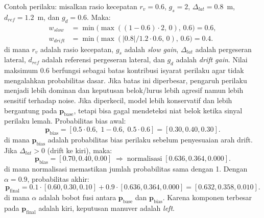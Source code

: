 \documentclass[conference]{IEEEtran}
\begin{document}
Contoh perilaku: misalkan rasio kecepatan $r_v=0.6$, $g_s=2$, $\Delta_{lat}=0.8$~m, $d_{ref}=1.2$~m, dan $g_d=0.6$. Maka:
\begin{align}
w_{slow} &= \min\big(\max((1-0.6)\cdot 2,\,0),\,0.6\big)=0.6, \\
w_{drift} &= \min\big(\max(|0.8|/1.2\cdot 0.6,\,0),\,0.6\big)=0.4.
\end{align}
di mana $r_v$ adalah rasio kecepatan, $g_s$ adalah \textit{slow gain}, $\Delta_{lat}$ adalah pergeseran lateral, $d_{ref}$ adalah referensi pergeseran lateral, dan $g_d$ adalah \textit{drift gain}.
Nilai maksimum 0.6 berfungsi sebagai batas kontribusi isyarat perilaku agar tidak mengalahkan probabilitas dasar. Jika batas ini diperbesar, pengaruh perilaku menjadi lebih dominan dan keputusan belok/lurus lebih agresif namun lebih sensitif terhadap noise. Jika diperkecil, model lebih konservatif dan lebih bergantung pada $\mathbf{p}_{\text{base}}$, tetapi bisa gagal mendeteksi niat belok ketika sinyal perilaku lemah.
Probabilitas bias awal:
\begin{equation}
\mathbf{p}_{\text{bias}}=[0.5\cdot 0.6,\;1-0.6,\;0.5\cdot 0.6]=[0.30,0.40,0.30].
\end{equation}
di mana $\mathbf{p}_{\text{bias}}$ adalah probabilitas bias perilaku sebelum penyesuaian arah drift.
Jika $\Delta_{lat}>0$ (drift ke kiri), maka:
\begin{equation}
\mathbf{p}_{\text{bias}}=[0.70,0.40,0.00] \;\Rightarrow\; \text{normalisasi} \; [0.636,0.364,0.000].
\end{equation}
di mana normalisasi memastikan jumlah probabilitas sama dengan 1.
Dengan $\alpha=0.9$, probabilitas akhir:
\begin{equation}
\mathbf{p}_{\text{final}}=0.1\cdot[0.60,0.30,0.10]+0.9\cdot[0.636,0.364,0.000]
=[0.632,0.358,0.010].
\end{equation}
di mana $\alpha$ adalah bobot fusi antara $\mathbf{p}_{\text{base}}$ dan $\mathbf{p}_{\text{bias}}$.
Karena komponen terbesar pada $\mathbf{p}_{\text{final}}$ adalah kiri, keputusan manuver adalah \textit{left}.
\end{document}
